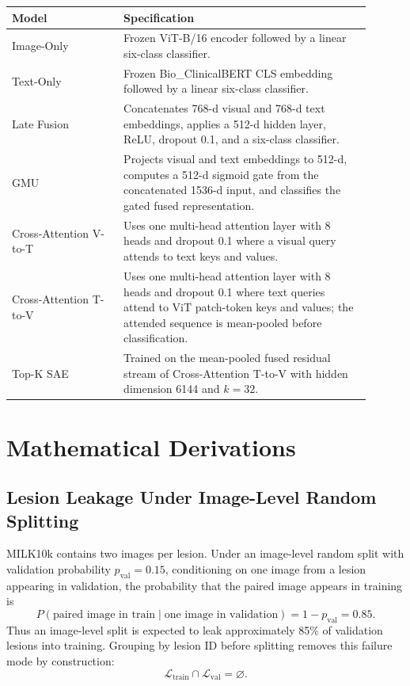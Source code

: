 \documentclass[10pt]{article}
\begin{document}
\begin{tabular}{>{\raggedright\arraybackslash}p{0.28\linewidth}>{\raggedright\arraybackslash}p{0.62\linewidth}}
\toprule
\textbf{Model} & \textbf{Specification} \\
\midrule
Image-Only & Frozen ViT-B/16 encoder followed by a linear six-class classifier. \\
Text-Only & Frozen Bio\_ClinicalBERT CLS embedding followed by a linear six-class classifier. \\
Late Fusion & Concatenates 768-d visual and 768-d text embeddings, applies a 512-d hidden layer, ReLU, dropout 0.1, and a six-class classifier. \\
GMU & Projects visual and text embeddings to 512-d, computes a 512-d sigmoid gate from the concatenated 1536-d input, and classifies the gated fused representation. \\
Cross-Attention V-to-T & Uses one multi-head attention layer with 8 heads and dropout 0.1 where a visual query attends to text keys and values. \\
Cross-Attention T-to-V & Uses one multi-head attention layer with 8 heads and dropout 0.1 where text queries attend to ViT patch-token keys and values; the attended sequence is mean-pooled before classification. \\
Top-K SAE & Trained on the mean-pooled fused residual stream of Cross-Attention T-to-V with hidden dimension 6144 and $k=32$. \\
\bottomrule
\end{tabular}

\section*{Mathematical Derivations}

\subsection*{Lesion Leakage Under Image-Level Random Splitting}

MILK10k contains two images per lesion. Under an image-level random split
with validation probability $p_{\mathrm{val}}=0.15$, conditioning on one image
from a lesion appearing in validation, the probability that the paired image
appears in training is
\[
P(\text{paired image in train}\mid\text{one image in validation})
=1-p_{\mathrm{val}}=0.85.
\]
Thus an image-level split is expected to leak approximately 85\% of validation
lesions into training. Grouping by lesion ID before splitting removes this
failure mode by construction:
\[
\mathcal{L}_{\mathrm{train}}\cap\mathcal{L}_{\mathrm{val}}=\varnothing.
\]
\end{document}
